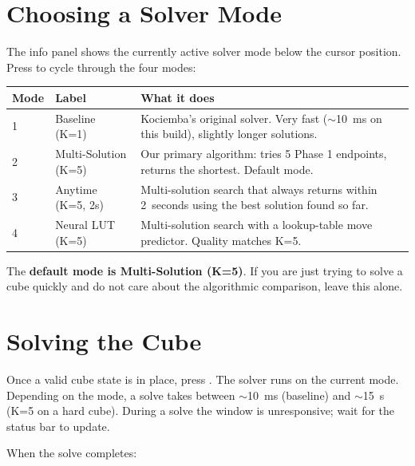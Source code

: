 \documentclass[11pt,a4paper]{article}
\newcommand{\key}[1]{\fbox{\texttt{\strut#1}}}
\begin{document}
\section{Choosing a Solver Mode}

The info panel shows the currently active solver mode below the cursor
position. Press \key{M} to cycle through the four modes:

\begin{center}
\begin{tabular}{@{}ll p{}@{}}
\toprule
\textbf{Mode} & \textbf{Label} & \textbf{What it does} \\
\midrule
1 & Baseline (K=1)        & Kociemba's original solver. Very fast
                            ($\sim$10~ms on this build), slightly longer solutions. \\
2 & Multi-Solution (K=5)  & Our primary algorithm: tries 5 Phase 1
                            endpoints, returns the shortest. Default mode. \\
3 & Anytime (K=5, 2s)     & Multi-solution search that always returns within
                            2~seconds using the best solution found so far. \\
4 & Neural LUT (K=5)      & Multi-solution search with a lookup-table move
                            predictor. Quality matches K=5. \\
\bottomrule
\end{tabular}
\end{center}

The \textbf{default mode is Multi-Solution (K=5)}. If you are just trying
to solve a cube quickly and do not care about the algorithmic
comparison, leave this alone.

\section{Solving the Cube}

Once a valid cube state is in place, press \key{Enter}. The solver runs
on the current mode. Depending on the mode, a solve takes between
$\sim$10~ms (baseline) and $\sim$15~s (K=5 on a hard cube). During a
solve the window is unresponsive; wait for the status bar to update.

When the solve completes:
\end{document}
